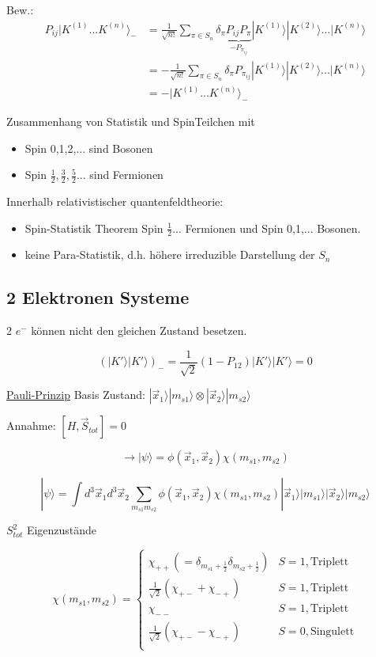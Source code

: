 Bew.: 
\begin{align}
P_{ij}|K^{(1)}...K^{(n)}\rangle_-&=\frac{1}{\sqrt{n!}}\sum_{\pi\in S_n}\delta_\pi\underbrace{P_{ij}P_\pi}_{-P_{\pi_{ij}}} |K^{(1)}\rangle|K^{(2)}\rangle...|K^{(n)}\rangle \\
&=-\frac{1}{\sqrt{n!}}\sum_{\pi\in S_n}\delta_\pi P_{\pi_{ij}} |K^{(1)}\rangle|K^{(2)}\rangle ...|K^{(n)}\rangle \\
&=-|K^{(1)} ... K^{(n)}\rangle_{-}
\end{align}



Zusammenhang von Statistik und SpinTeilchen mit 
\begin{itemize}
\item Spin 0,1,2,... sind Bosonen
\item Spin \(\frac{1}{2},\frac{3}{2},\frac{5}{2}\)... sind Fermionen
\end{itemize}

Innerhalb relativistischer quantenfeldtheorie: 
\begin{itemize}
\item Spin-Statistik Theorem Spin \(\frac{1}{2}\)... Fermionen und Spin 0,1,... Bosonen. 
\item keine Para-Statistik, d.h. höhere irreduzible Darstellung der \(S_n\)
\end{itemize}

\subsection{2 Elektronen Systeme}

2 \(e^-\) können nicht den gleichen Zustand besetzen. 

\[(|K'\rangle |K'\rangle)_- = \frac{1}{\sqrt{2}}(1-P_{12})|K'\rangle |K'\rangle = 0\]

\underline{Pauli-Prinzip}
Basis Zustand: \(|\vec x_1\rangle |m_{s1}\rangle \otimes |\vec x_2\rangle |m_{s2}\rangle\)

Annahme: \([H,\vec S_{tot}]=0\)

\[\rightarrow |\psi\rangle = \phi (\vec x_1,\vec x_2)\chi (m_{s1},m_{s2})\]

\[|\psi\rangle  = \int d^3\vec x_1d^3\vec x_2\sum_{m_{s1}m_{s2}}\phi(\vec x_1,\vec x_2)\chi (m_{s1},m_{s2})|\vec x_1\rangle |m_{s1}\rangle |\vec x_2\rangle |m_{s2}\rangle \]

\(S^2_{tot}\) Eigenzustände

\[\chi(m_{s1},m_{s2})=\begin{cases}
  \chi_{++}(=\delta_{m_{s1}+\frac{1}{2}} \delta_{m_{s2}+\frac{1}{2}}) & S=1,\text{Triplett}\\
  \frac{1}{\sqrt{2}}(\chi_{+-}+\chi_{-+}) & S=1,\text{Triplett}\\
 \chi_{--} & S=1,\text{Triplett} \\
 \frac{1}{\sqrt{2}}(\chi_{+-}-\chi_{-+}) & S=0, \text{Singulett}\\
\end{cases}\]

